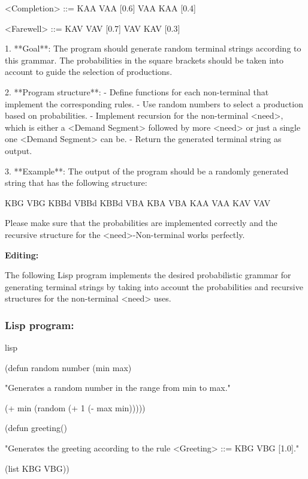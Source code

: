 \documentclass[
]{article}
\begin{document}
\textless Completion\textgreater{} ::= KAA VAA {[}0.6{]} \textbar{} VAA
KAA {[}0.4{]}

\textless Farewell\textgreater{} ::= KAV VAV {[}0.7{]} \textbar{} VAV
KAV {[}0.3{]}

1. **Goal**: The program should generate random terminal strings
according to this grammar. The probabilities in the square brackets
should be taken into account to guide the selection of productions.

2. **Program structure**: - Define functions for each non-terminal that
implement the corresponding rules. - Use random numbers to select a
production based on probabilities. - Implement recursion for the
non-terminal \textless need\textgreater, which is either a
\textless Demand Segment\textgreater{} followed by more
\textless need\textgreater{} or just a single one \textless Demand
Segment\textgreater{} can be. - Return the generated terminal string as
output.

3. **Example**: The output of the program should be a randomly generated
string that has the following structure:

KBG VBG KBBd VBBd KBBd VBA KBA VBA KAA VAA KAV VAV

Please make sure that the probabilities are implemented correctly and
the recursive structure for the \textless need\textgreater-Non-terminal
works perfectly.

\textbf{Editing:}

The following Lisp program implements the desired probabilistic grammar
for generating terminal strings by taking into account the probabilities
and recursive structures for the non-terminal
\textless need\textgreater{} uses.

\subsubsection{\texorpdfstring{\textbf{Lisp
program:}}{Lisp program:}}\label{lisp-program}

lisp

(defun random number (min max)

"Generates a random number in the range from min to max."

(+ min (random (+ 1 (- max min)))))

(defun greeting()

"Generates the greeting according to the rule
\textless Greeting\textgreater{} ::= KBG VBG {[}1.0{]}."

(list \textquotesingle KBG \textquotesingle VBG))
\end{document}
